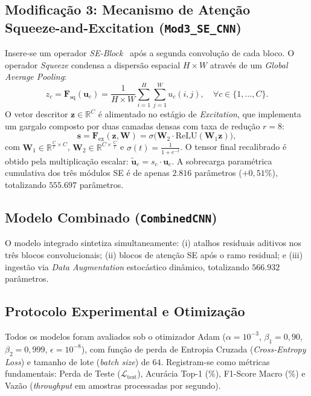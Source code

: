 \documentclass[runningheads]{llncs}
\begin{document}
\subsection{Modifica\c{c}\~{a}o 3: Mecanismo de Aten\c{c}\~{a}o Squeeze-and-Excitation (\texttt{Mod3\_SE\_CNN})}
Insere-se um operador \textit{SE-Block}~\cite{hu2018squeeze} ap\'{o}s a segunda convolu\c{c}\~{a}o de cada bloco. O operador \textit{Squeeze} condensa a dispers\~{a}o espacial $H \times W$ atrav\'{e}s de um \textit{Global Average Pooling}:
\begin{equation}
    z_c = \mathbf{F}_{\text{sq}}(\mathbf{u}_c) = \frac{1}{H \times W} \sum_{i=1}^{H} \sum_{j=1}^{W} u_c(i, j), \quad \forall c \in \{1, \dots, C\}.
    \label{eq:squeeze}
\end{equation}
O vetor descritor $\mathbf{z} \in \mathbb{R}^C$ \'{e} alimentado no est\'{a}gio de \textit{Excitation}, que implementa um gargalo composto por duas camadas densas com taxa de redu\c{c}\~{a}o $r = 8$:
\begin{equation}
    \mathbf{s} = \mathbf{F}_{\text{ex}}(\mathbf{z}, \mathbf{W}) = \sigma\Big(\mathbf{W}_2 \cdot \text{ReLU}(\mathbf{W}_1 \mathbf{z})\Big),
    \label{eq:excitation}
\end{equation}
com $\mathbf{W}_1 \in \mathbb{R}^{\frac{C}{r} \times C}$, $\mathbf{W}_2 \in \mathbb{R}^{C \times \frac{C}{r}}$ e $\sigma(t) = \frac{1}{1 + e^{-t}}$. O tensor final recalibrado \'{e} obtido pela multiplica\c{c}\~{a}o escalar: $\tilde{\mathbf{u}}_c = s_c \cdot \mathbf{u}_c$. A sobrecarga param\'{e}trica cumulativa dos tr\^{e}s m\'{o}dulos SE \'{e} de apenas $2.816$ par\^{a}metros ($+0{,}51\%$), totalizando $555.697$ par\^{a}metros.

\subsection{Modelo Combinado (\texttt{CombinedCNN})}
O modelo integrado sintetiza simultaneamente: (i) atalhos residuais aditivos nos tr\^{e}s blocos convolucionais; (ii) blocos de aten\c{c}\~{a}o SE ap\'{o}s o ramo residual; e (iii) ingest\~{a}o via \textit{Data Augmentation} estoc\'{a}stico din\^{a}mico, totalizando $566.932$ par\^{a}metros.

\subsection{Protocolo Experimental e Otimiza\c{c}\~{a}o}
Todos os modelos foram avaliados sob o otimizador Adam ($\alpha = 10^{-3}$, $\beta_1 = 0{,}90$, $\beta_2 = 0{,}999$, $\epsilon = 10^{-8}$), com fun\c{c}\~{a}o de perda de Entropia Cruzada (\textit{Cross-Entropy Loss}) e tamanho de lote (\textit{batch size}) de $64$. Registram-se como m\'{e}tricas fundamentais: Perda de Teste ($\mathcal{L}_{\text{test}}$), Acur\'{a}cia Top-1 (\%), F1-Score Macro (\%) e Vaz\~{a}o (\textit{throughput} em amostras processadas por segundo).
\end{document}
